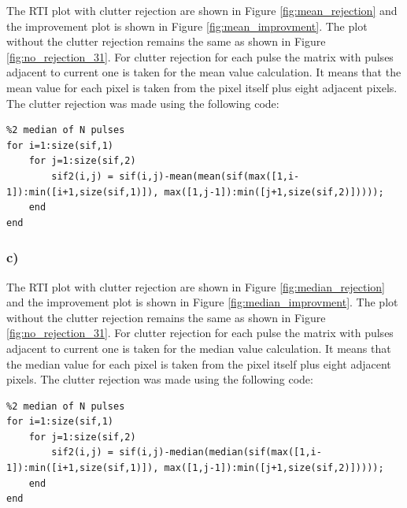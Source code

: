 \documentclass{article}
\begin{document}
The RTI plot with clutter rejection are shown in Figure \ref{fig:mean_rejection} and the improvement plot is shown in Figure \ref{fig:mean_improvment}. The plot without the clutter rejection remains the same as shown in Figure \ref{fig:no_rejection_31}. For clutter rejection for each pulse the matrix with pulses adjacent to current one is taken for the mean value calculation. It means that the mean value for each pixel is taken from the pixel itself plus eight adjacent pixels. The clutter rejection was made using the following code:

\begin{lstlisting}
%2 median of N pulses
for i=1:size(sif,1)
    for j=1:size(sif,2)
        sif2(i,j) = sif(i,j)-mean(mean(sif(max([1,i-1]):min([i+1,size(sif,1)]), max([1,j-1]):min([j+1,size(sif,2)]))));
    end
end
\end{lstlisting}


\subsubsection{c)}

The RTI plot with clutter rejection are shown in Figure \ref{fig:median_rejection} and the improvement plot is shown in Figure \ref{fig:median_improvment}. The plot without the clutter rejection remains the same as shown in Figure \ref{fig:no_rejection_31}. For clutter rejection for each pulse the matrix with pulses adjacent to current one is taken for the median value calculation. It means that the median value for each pixel is taken from the pixel itself plus eight adjacent pixels. The clutter rejection was made using the following code:

\begin{lstlisting}
%2 median of N pulses
for i=1:size(sif,1)
    for j=1:size(sif,2)
        sif2(i,j) = sif(i,j)-median(median(sif(max([1,i-1]):min([i+1,size(sif,1)]), max([1,j-1]):min([j+1,size(sif,2)]))));
    end
end
\end{lstlisting}
\end{document}
